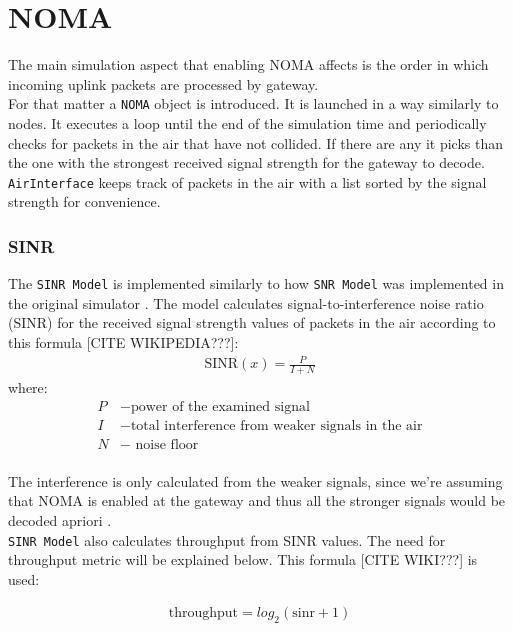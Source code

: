 \section{NOMA}
The main simulation aspect that enabling NOMA affects is the 
order in which incoming uplink packets are processed by 
gateway. \\

For that matter a \texttt{NOMA} object is introduced. It is 
launched in a way similarly to nodes. It executes a loop
until the end of the simulation time and periodically checks
for packets in the air that have not collided. If there are any
it picks than the one with the strongest received signal 
strength for the gateway to decode. \texttt{AirInterface} keeps
track of packets in the air with a list sorted by the signal
strength for convenience. 

\subsubsection{SINR}
The \texttt{SINR Model} is implemented similarly to how \texttt{SNR Model} was implemented in the original simulator \cite{simulator}. The model calculates signal-to-interference noise ratio (SINR) for the received signal strength values of packets in the air according to this formula [CITE WIKIPEDIA???]:
\begin{align}
    \text{SINR}(x) = \frac{P}{I + N} \label{eq:sinr}
\end{align}
where:
\begin{align*}
     P &- \text{power of the examined signal}\\
     I &- \text{total interference from weaker signals in the air}\\
     N &- \text{ noise floor}\\
\end{align*}

The interference is only calculated from the weaker signals, since we're assuming that NOMA is enabled at 
the gateway and thus all the stronger signals would be
decoded apriori \cite{noma_original}.\\

\texttt{SINR Model} also calculates throughput from SINR values. The need for throughput metric will be explained below. This formula [CITE WIKI???] is used:

\begin{align}
    \text{throughput} = \text{$log_{2}$}(\text{sinr} + 1)
\end{align}

